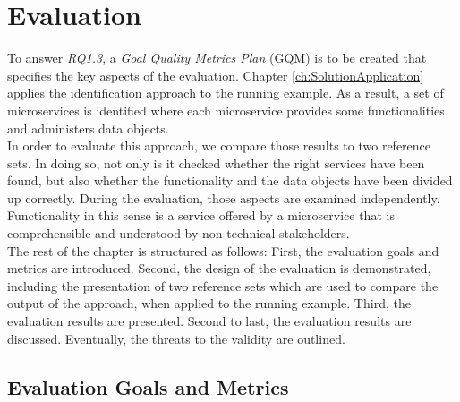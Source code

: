 \chapter{Evaluation}
\label{ch:Evalutation}

To answer \textit{RQ1.3}, a \textit{Goal Quality Metrics Plan } (GQM) is to be created that specifies the key aspects of the evaluation. 
Chapter \ref{ch:SolutionApplication} applies the identification approach to the running example. As a result, a set of microservices is identified where each microservice provides some functionalities and administers data objects.\\
In order to evaluate this approach, we compare those results to two reference sets. In doing so, not only is it checked whether the right services have been found, but also whether the functionality and the data objects have been divided up correctly. During the evaluation, those aspects are examined independently. Functionality in this sense is a service offered by a microservice that is comprehensible and understood by non-technical stakeholders. \\
The rest of the chapter is structured as follows: First, the evaluation goals and metrics are introduced. Second, the design of the evaluation is demonstrated, including the presentation of two reference sets which are used to compare the output of the approach, when applied to the running example. Third, the evaluation results are presented. Second to last, the evaluation results are discussed. Eventually, the threats to the validity are outlined.


\section{Evaluation Goals and Metrics}

